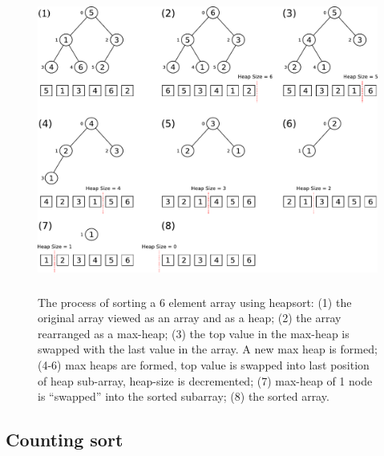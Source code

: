 \documentclass[12pt, a4paper]{article}
\begin{document}
\begin{figure}[H]
    \centering
    \includegraphics[height=10cm]{heap_sort2.pdf}
    \caption{\label{fig:heapsort}The process of sorting a 6 element array using heapsort: (1) the original array viewed as an array and as a heap; (2) the array rearranged as a max-heap; (3) the top value in the max-heap is swapped with the last value in the array. A new max heap is formed; (4-6) max heaps are formed, top value is swapped into last position of heap sub-array, heap-size is decremented; (7) max-heap of 1 node is   ``swapped'' into the sorted subarray; (8) the sorted array.}
\end{figure}





\subsection{Counting sort}
\end{document}
